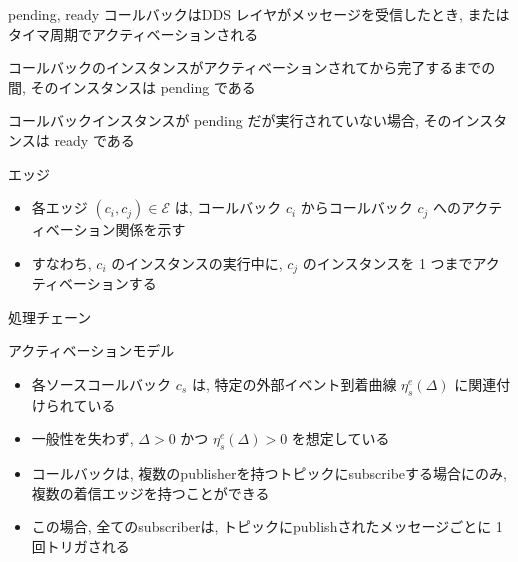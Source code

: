 \begin{frame}{pending, ready}
    コールバックはDDS レイヤがメッセージを受信したとき, またはタイマ周期でアクティベーションされる
    \begin{definition}[pending]
        コールバックのインスタンスがアクティベーションされてから完了するまでの間, そのインスタンスは pending である
    \end{definition}
    \begin{definition}[ready]
        コールバックインスタンスが pending だが実行されていない場合, そのインスタンスは ready である
    \end{definition}
\end{frame}

\begin{frame}{エッジ}
    \begin{itemize}
        \item 各エッジ $\left(c_{i}, c_{j}\right) \in \mathcal{E}$ は, コールバック $c_{i}$ からコールバック $c_{j}$ へのアクティベーション関係を示す
        \item すなわち, $c_{i}$ のインスタンスの実行中に, $c_{j}$ のインスタンスを 1 つまでアクティベーションする
    \end{itemize}
\end{frame}

\begin{frame}{処理チェーン}
\end{frame}

\begin{frame}{アクティベーションモデル}
    \begin{itemize}
        \item 各ソースコールバック $c_{s}$ は, 特定の外部イベント到着曲線 $\eta_{s}^{e}(\Delta)$ \cite{henia2005system, leboudec2001theory, thiele2000real}に関連付けられている
        \item 一般性を失わず, $\Delta>0$ かつ $\eta_{s}^{e}(\Delta)>0$ を想定している
        \item コールバックは, 複数のpublisherを持つトピックにsubscribeする場合にのみ, 複数の着信エッジを持つことができる
        \item この場合, 全てのsubscriberは, トピックにpublishされたメッセージごとに 1 回トリガされる
    \end{itemize}
\end{frame}

